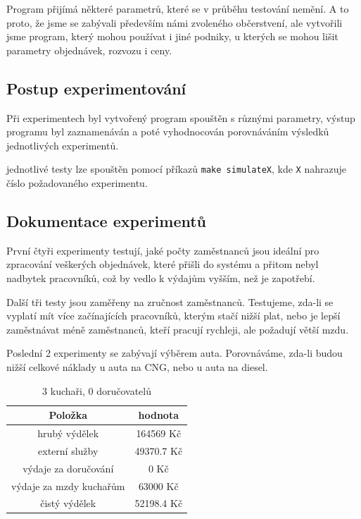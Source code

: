 \documentclass[a4paper, 11pt]{article}
\begin{document}
Program přijímá některé parametrů, které se v průběhu testování nemění. A to proto, že jsme se zabývali především námi zvoleného občerstvení, ale vytvořili jsme program, který mohou používat i jiné podniky, u kterých se mohou lišit parametry objednávek, rozvozu i ceny.

\subsection{Postup experimentování}
Při experimentech byl vytvořený program spouštěn s různými parametry, výstup programu byl zaznamenáván a poté vyhodnocován porovnáváním výsledků jednotlivých experimentů.


jednotlivé testy lze spouštěn pomocí příkazů \texttt{make simulateX}, kde \texttt{X} nahrazuje číslo požadovaného experimentu.

\subsection{Dokumentace experimentů}
První čtyři experimenty testují, jaké počty zaměstnanců jsou ideální pro zpracování veškerých objednávek, které přišli do systému a přitom nebyl nadbytek pracovníků, což by vedlo k výdajům vyšším, než je zapotřebí.

Další tři testy jsou zaměřeny na zručnost zaměstnanců. Testujeme, zda-li se vyplatí mít více začínajících pracovníků, kterým stačí nižší plat, nebo je lepší zaměstnávat méně zaměstnanců, kteří pracují rychleji, ale požadují větší mzdu.

Poslední 2 experimenty se zabývají výběrem auta. Porovnáváme, zda-li budou nižší celkové náklady u auta na CNG, nebo u auta na diesel. 

\begin{table}[h]
\centering
\begin{tabular}{cc}
\textbf{Položka} & \textbf{hodnota}                                                                                   \\ \hline
hrubý výdělek & 164569 Kč \\ \hline
externí služby  & 49370.7 Kč \\ \hline                      
výdaje za doručování &  0 Kč \\ \hline
výdaje za mzdy kuchařům &  63000 Kč \\ \hline
čistý výdělek &  52198.4 Kč
\end{tabular}
\caption{3 kuchaři, 0 doručovatelů}
\end{table}
\end{document}
